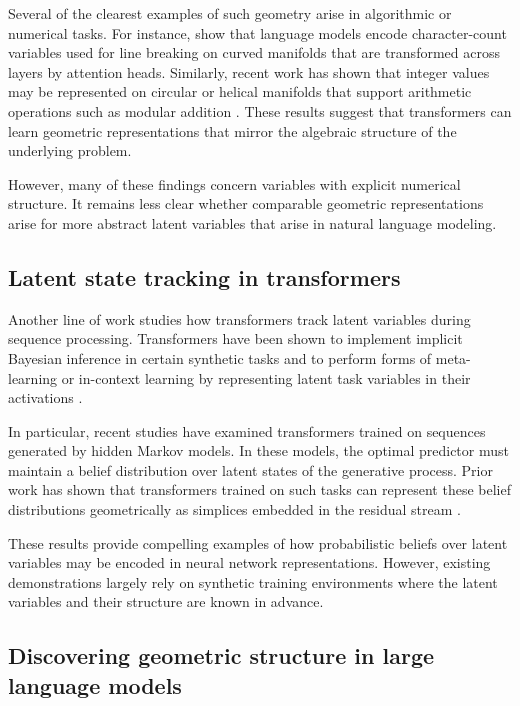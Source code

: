 \documentclass{article}
\begin{document}
Several of the clearest examples of such geometry arise in algorithmic or numerical tasks.  For instance, \citet{gurnee2025manifolds} show
that language models encode character-count variables used for line breaking on curved manifolds that are transformed across layers by
attention heads.  Similarly, recent work has shown that integer values may be represented on circular or helical manifolds that support
arithmetic operations such as modular addition \citep{kantamneni2025trigonometry}.  These results suggest that
transformers can learn geometric representations that mirror the algebraic structure of the underlying problem.

However, many of these findings concern variables with explicit numerical structure.  It remains less clear whether comparable
geometric representations arise for more abstract latent variables that arise in natural language modeling.

\subsection{Latent state tracking in transformers}

Another line of work studies how transformers track latent variables during sequence processing.  Transformers have been shown to implement
implicit Bayesian inference in certain synthetic tasks and to perform forms of meta-learning or in-context learning by representing latent
task variables in their activations \citep{akyurek2023icl, vonoswald2023transformers, xie2022meta-learning}.

In particular, recent studies have examined transformers trained on sequences generated by hidden Markov models.  In these models, the
optimal predictor must maintain a belief distribution over latent states of the generative process.  Prior work has shown that
transformers trained on such tasks can represent these belief distributions geometrically as simplices embedded in the residual
stream \citep{shai2024transformers, piotrowski2025constrained}.

These results provide compelling examples of how probabilistic beliefs over latent variables may be encoded in neural network
representations.  However, existing demonstrations largely rely on synthetic training environments where the latent variables and their
structure are known in advance.

\subsection{Discovering geometric structure in large language models}
\end{document}
